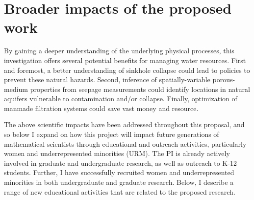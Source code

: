 \documentclass[12pt]{article}
\newcommand{\np}{\newpage \noindent}
\begin{document}


\np



\section{Broader impacts of the proposed work}

By gaining a deeper understanding of the underlying physical processes, this investigation offers several potential benefits for managing water resources. First and foremost, a better understanding of sinkhole collapse could lead to policies to prevent these natural hazards. Second, inference of spatially-variable porous-medium properties from seepage measurements could identify locations in natural aquifers vulnerable to contamination and/or collapse. Finally, optimization of manmade filtration systems could save vast money and resource.

The above scientific impacts have been addressed throughout this proposal, and so below I expand on how this project will impact future generations of mathematical scientists through educational and outreach activities, particularly women and underrepresented minorities (URM). 
The PI is already actively involved in graduate and undergraduate research, as well as outreach to K-12 students. Further, I have successfully recruited women and underrepresented minorities in both undergraduate and graduate research. Below, I describe a range of new educational activities that are related to the proposed research.

\end{document}
